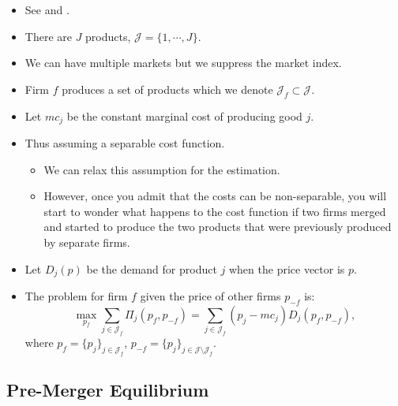 \documentclass[
]{book}
\providecommand{\tightlist}{%
  \setlength{\itemsep}{0pt}\setlength{\parskip}{0pt}}
\begin{document}
\begin{itemize}
\tightlist
\item
  See \citet{Nevo2000c} and \citet{Nevo2001}.
\item
  There are \(J\) products, \(\mathcal{J} = \{1, \cdots, J\}\).
\item
  We can have multiple markets but we suppress the market index.
\item
  Firm \(f\) produces a set of products which we denote \(\mathcal{J}_f \subset \mathcal{J}\).
\item
  Let \(mc_j\) be the constant marginal cost of producing good \(j\).
\item
  Thus assuming a separable cost function.

  \begin{itemize}
  \tightlist
  \item
    We can relax this assumption for the estimation.
  \item
    However, once you admit that the costs can be non-separable, you will start to wonder what happens to the cost function if two firms merged and started to produce the two products that were previously produced by separate firms.
  \end{itemize}
\item
  Let \(D_j(p)\) be the demand for product \(j\) when the price vector is \(p\).
\item
  The problem for firm \(f\) given the price of other firms \(p_{-f}\) is:
  \begin{equation}
  \max_{p_f} \sum_{j \in \mathcal{J}_f} \Pi_j(p_f, p_{-f}) = \sum_{j \in \mathcal{J}_f} (p_j - mc_j) D_j(p_f, p_{-f}),
  \end{equation}
  where \(p_f = \{p_j\}_{j \in \mathcal{J}_f}\), \(p_{-f} = \{p_j\}_{j \in \mathcal{J} \setminus \mathcal{J}_f}\).
\end{itemize}

\hypertarget{pre-merger-equilibrium}{%
\subsection{Pre-Merger Equilibrium}\label{pre-merger-equilibrium}}
\end{document}
